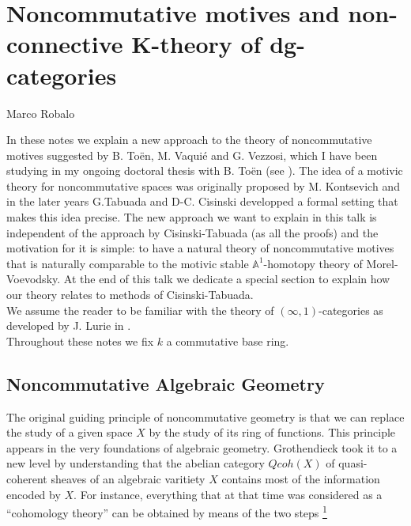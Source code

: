 \chapter{Noncommutative motives and non-connective K-theory of dg-categories}
\begin{flushright}
  Marco Robalo
\end{flushright}

\begin{refsection}


In these notes we explain a new approach to the theory of noncommutative motives suggested by B. To\"en, M. Vaqui\'e and G. Vezzosi, which I have been studying in my ongoing doctoral thesis with B. To\"en (see \cite{nc1, nc2}). The idea of a motivic theory for noncommutative spaces was originally proposed by M. Kontsevich \cite{kontsevich1, kontsevich2} and in the later years G.Tabuada and D-C. Cisinski \cite{tabuada-higherktheory, tabuada-cisinski, MR2822869, MR2986869} developped a formal setting that makes this idea precise. The new approach we want to explain in this talk is independent of the approach by Cisinski-Tabuada (as all the proofs) and the motivation for it is simple: to have a natural theory of noncommutative motives that is naturally comparable to the motivic stable $\mathbb{A}^1$-homotopy theory of Morel-Voevodsky. At the end of this talk we dedicate a special section to explain how our theory relates to methods of Cisinski-Tabuada.\\

 We assume the reader to be familiar with the theory of $(\infty,1)$-categories as developed by J. Lurie in \cite{htt, ha}. \\
 
Throughout these notes we fix $k$ a commutative base ring.

\section{Noncommutative Algebraic Geometry}



The original guiding principle of noncommutative geometry is that we can replace the study of a given space $X$ by the study of its ring of functions. This principle appears in the very foundations of algebraic geometry. Grothendieck took it to a new level by understanding that the abelian category $Qcoh(X)$ of quasi-coherent sheaves of an algebraic varitiety $X$ contains most of the information encoded by $X$.  For instance, everything that at that time was considered as a ``cohomology theory''  can be obtained by means of the two steps \footnote{ In fact, the replacement $X\to Qcoh(X)$ is so strong that in some cases it allow us to reconstruct the whole scheme (see the thesis of P. Gabriel for the notion of spectrum of an abelian category \cite{gabrielthesis}).} 



\end{refsection}

